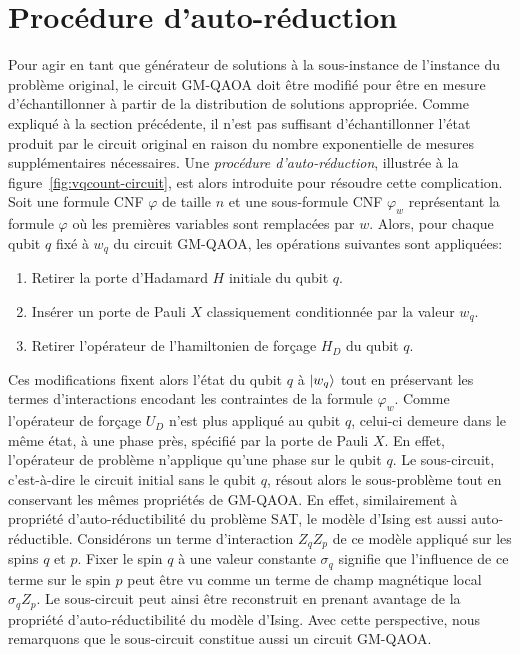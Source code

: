 
\section{Procédure d'auto-réduction}
\label{sec:procedure-auto-reduction}

Pour agir en tant que générateur de solutions à la sous-instance de l'instance du problème original, le circuit GM-QAOA doit être modifié pour être en mesure d'échantillonner à partir de la distribution de solutions appropriée. Comme expliqué à la section précédente, il n'est pas suffisant d'échantillonner l'état produit par le circuit original en raison du nombre exponentielle de mesures supplémentaires nécessaires. Une \textit{procédure d'auto-réduction}, illustrée à la figure~\ref{fig:vqcount-circuit}, est alors introduite pour résoudre cette complication. Soit une formule CNF $\varphi$ de taille $n$ et une sous-formule CNF $\varphi_{w}$ représentant la formule $\varphi$ où les premières variables sont remplacées par $w$. Alors, pour chaque qubit $q$ fixé à $w_{q}$ du circuit GM-QAOA, les opérations suivantes sont appliquées:

\begin{enumerate}[(1)]
    \item Retirer la porte d'Hadamard $H$ initiale du qubit $q$.
    \item Insérer un porte de Pauli $X$ classiquement conditionnée par la valeur $w_{q}$.
    \item Retirer l'opérateur de l'hamiltonien de forçage $H_{D}$ du qubit $q$.
\end{enumerate}

Ces modifications fixent alors l'état du qubit $q$ à $\ket{w_{q}}$ tout en préservant les termes d'interactions encodant les contraintes de la formule $\varphi_{w}$. Comme l'opérateur de forçage $U_{D}$ n'est plus appliqué au qubit $q$, celui-ci demeure dans le même état, à une phase près, spécifié par la porte de Pauli $X$. En effet, l'opérateur de problème n'applique qu'une phase sur le qubit $q$. Le sous-circuit, c'est-à-dire le circuit initial sans le qubit $q$, résout alors le sous-problème tout en conservant les mêmes propriétés de GM-QAOA. En effet, similairement à propriété d'auto-réductibilité du problème SAT, le modèle d'Ising est aussi auto-réductible. Considérons un terme d'interaction $Z_{q}Z_{p}$ de ce modèle appliqué sur les spins $q$ et $p$. Fixer le spin $q$ à une valeur constante $\sigma_{q}$ signifie que l'influence de ce terme sur le spin $p$ peut être vu comme un terme de champ magnétique local $\sigma_{q} Z_{p}$. Le sous-circuit peut ainsi être reconstruit en prenant avantage de la propriété d'auto-réductibilité du modèle d'Ising. Avec cette perspective, nous remarquons que le sous-circuit constitue aussi un circuit GM-QAOA.     


